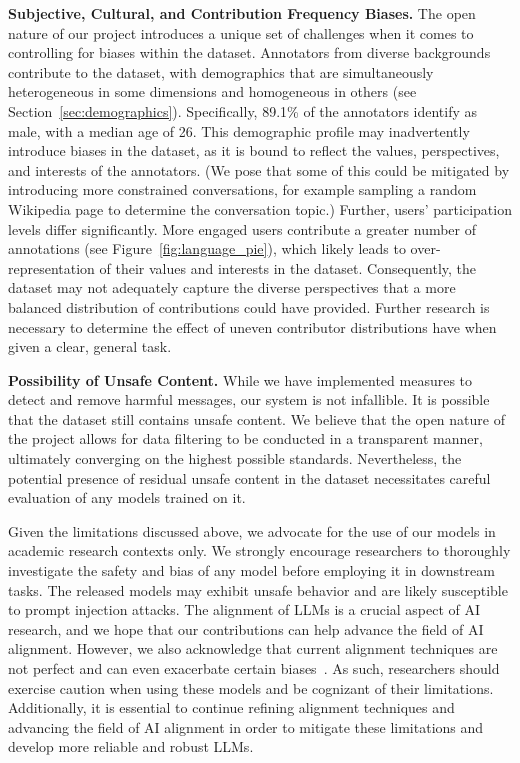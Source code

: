 \textbf{Subjective, Cultural, and Contribution Frequency Biases.} The open nature of our project introduces a unique set of challenges when it comes to controlling for biases within the dataset. Annotators from diverse backgrounds contribute to the dataset, with demographics that are simultaneously heterogeneous in some dimensions and homogeneous in others (see Section~\ref{sec:demographics}). Specifically, 89.1\% of the annotators identify as male, with a median age of 26. This demographic profile may inadvertently introduce biases in the dataset, as it is bound to reflect the values, perspectives, and interests of the annotators. (We pose that some of this could be mitigated by introducing more constrained conversations, for example sampling a random Wikipedia page to determine the conversation topic.) Further, users' participation levels differ significantly. More engaged users contribute a greater number of annotations (see Figure~\ref{fig:language_pie}), which likely leads to over-representation of their values and interests in the dataset. Consequently, the dataset may not adequately capture the diverse perspectives that a more balanced distribution of contributions could have provided. Further research is necessary to determine the effect of uneven contributor distributions have when given a clear, general task.

\textbf{Possibility of Unsafe Content.} While we have implemented measures to detect and remove harmful messages, our system is not infallible. It is possible that the dataset still contains unsafe content. We believe that the open nature of the project allows for data filtering to be conducted in a transparent manner, ultimately converging on the highest possible standards. Nevertheless, the potential presence of residual unsafe content in the dataset necessitates careful evaluation of any models trained on it.

Given the limitations discussed above, we advocate for the use of our models in academic research contexts only. We strongly encourage researchers to thoroughly investigate the safety and bias of any model before employing it in downstream tasks. The released models may exhibit unsafe behavior and are likely susceptible to prompt injection attacks. The alignment of LLMs is a crucial aspect of AI research, and we hope that our contributions can help advance the field of AI alignment. However, we also acknowledge that current alignment techniques are not perfect and can even exacerbate certain biases~\cite{glaese2022improving}. As such, researchers should exercise caution when using these models and be cognizant of their limitations. Additionally, it is essential to continue refining alignment techniques and advancing the field of AI alignment in order to mitigate these limitations and develop more reliable and robust LLMs.

